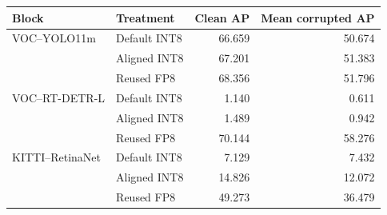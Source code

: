\begin{tabular}{llrr}
\toprule
Block & Treatment & Clean AP & Mean corrupted AP \\
\midrule
VOC--YOLO11m & Default INT8 & 66.659 & 50.674 \\
 & Aligned INT8 & 67.201 & 51.383 \\
 & Reused FP8 & 68.356 & 51.796 \\
\addlinespace
VOC--RT-DETR-L & Default INT8 & 1.140 & 0.611 \\
 & Aligned INT8 & 1.489 & 0.942 \\
 & Reused FP8 & 70.144 & 58.276 \\
\addlinespace
KITTI--RetinaNet & Default INT8 & 7.129 & 7.432 \\
 & Aligned INT8 & 14.826 & 12.072 \\
 & Reused FP8 & 49.273 & 36.479 \\
\bottomrule
\end{tabular}

